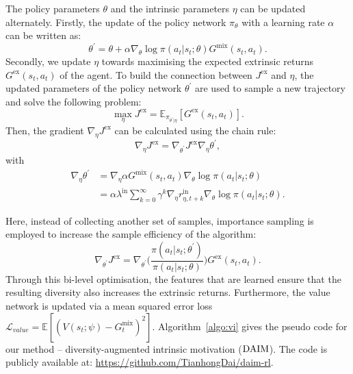 The policy parameters $\theta$ and the intrinsic parameters $\eta$ can be updated alternately.
Firstly, the update of the policy network $\pi_{\theta}$ with a learning rate $\alpha$ can be written as:
\begin{equation}
    \theta^{\prime}=\theta + \alpha\nabla_{\theta} \log \pi(a_t|s_t;\theta)G^{\text{mix}}(s_t, a_t).
\label{eq:mix_cost}
\end{equation}
Secondly, we update $\eta$ towards maximising the expected extrinsic returns $G^{\text{ex}}(s_t, a_t)$ of the agent. 
To build the connection between $J^{\text{ex}}$ and $\eta$, the updated parameters of the policy network $\theta^{\prime}$ are used to sample a new trajectory and solve the following problem:
\begin{equation}
    \max_{\eta} J^{\text{ex}} = \mathbb{E}_{\pi_{\theta^{\prime}|\eta}}[G^{\text{ex}}(s_t, a_t)].
\label{eq:cost_ex}
\end{equation}
Then, the gradient $\nabla_{\eta} J^{\text{ex}}$ can be calculated using the chain rule:
\begin{equation}
    \nabla_{\eta} J^{\text{ex}} = \nabla_{\theta^{\prime}}J^{\text{ex}}\nabla_{\eta}\theta^{\prime}, 
  \label{eq:chain_rule}
\end{equation}
with 
\begin{align}
    \nabla_{\eta}\theta^{\prime} &=  \nabla_{\eta}\alpha G^{\text{mix}}(s_t, a_t) \nabla_{\theta} \log \pi(a_t|s_t;\theta) \nonumber \\
    &= \alpha\lambda^{\text{in}}\sum_{k=0}^{\infty}\gamma^{k}\nabla_{\eta}r^{\text{in}}_{\eta,t+k}\nabla_{\theta} \log \pi(a_t|s_t;\theta). 
\end{align}

Here, instead of collecting another set of samples, importance sampling is employed to increase the sample efficiency of the algorithm:
\begin{equation}
    \nabla_{\theta^{\prime}}J^{\text{ex}} =  \nabla_{\theta^{\prime}}\Bigg (\frac{\pi(a_{t}|s_{t};\theta^{\prime})}{\pi(a_{t}|s_{t};\theta)}\Bigg ) G^{\text{ex}}(s_{t}, a_{t}).
\label{eq:importance_sampling}
\end{equation}
Through this bi-level optimisation, the features that are learned ensure that the resulting diversity also increases the extrinsic returns. Furthermore, the value network is updated via a mean squared error loss $\mathcal{L}_{value} = \mathbb{E}[(V(s_{t};\psi) - G_{t}^{\text{mix}})^2]$. Algorithm~\ref{algo:vi} gives the pseudo code for our method -- diversity-augmented intrinsic motivation ($\text{DAIM}$). The code is publicly available at: \url{https://github.com/TianhongDai/daim-rl}.

